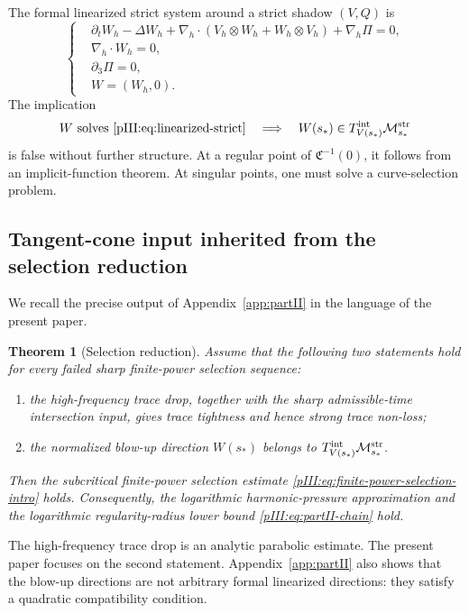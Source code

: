 \documentclass[11pt]{article}
\numberwithin{equation}{section}
\theoremstyle{plain}
\newtheorem{theorem}{Theorem}[section]
\theoremstyle{definition}
\theoremstyle{remark}
\newcommand{\nabh}{\nabla_h}
\newcommand{\divh}{\nabla_h\!\cdot}
\newcommand{\Mstr}{\mathcal M^{\rm str}}
\newcommand{\Tint}{T^{\rm int}}
\newcommand{\calC}{\mathfrak C}
\begin{document}
The formal linearized strict system around a strict shadow \((V,Q)\) is
\begin{equation}\label{pIII:eq:linearized-strict}
\left\{
\begin{aligned}
        &\partial_tW_h-\Delta W_h
        +\nabh\cdot(V_h\otimes W_h+W_h\otimes V_h)
        +\nabh\Pi=0,\\
        &\divh W_h=0,\\
        &\partial_3\Pi=0,\\
        &W=(W_h,0).
\end{aligned}
\right.
\end{equation}
The implication
\[
        W\text{ solves }\eqref{pIII:eq:linearized-strict}
        \quad\Longrightarrow\quad
        W(s_*)\in\Tint_{V(s_*)}\Mstr_{s_*}
\]
is false without further structure.  At a regular point of \(\calC^{-1}(0)\), it follows
from an implicit-function theorem.  At singular points, one must solve a curve-selection
problem.

\subsection{Tangent-cone input inherited from the selection reduction}\label{pIII:sec:partII-reduction}

We recall the precise output of Appendix~\ref{app:partII} in the language of the present paper.

\begin{theorem}[Selection reduction]\label{pIII:thm:partII-reduction}
Assume that the following two statements hold for every failed sharp finite-power
selection sequence:
\begin{enumerate}[label=(\alph*)]
\item the high-frequency trace drop, together with the sharp admissible-time intersection input, gives trace tightness and hence strong trace non-loss;
\item the normalized blow-up direction \(W(s_*)\) belongs to
\(\Tint_{V(s_*)}\Mstr_{s_*}\).
\end{enumerate}
Then the subcritical finite-power selection estimate \eqref{pIII:eq:finite-power-selection-intro}
holds.  Consequently, the logarithmic harmonic-pressure approximation and the logarithmic
regularity-radius lower bound \eqref{pIII:eq:partII-chain} hold.
\end{theorem}

The high-frequency trace drop is an analytic parabolic estimate.  The present paper
focuses on the second statement.  Appendix~\ref{app:partII} also shows that the blow-up directions are not
arbitrary formal linearized directions: they satisfy a quadratic compatibility condition.
\end{document}
